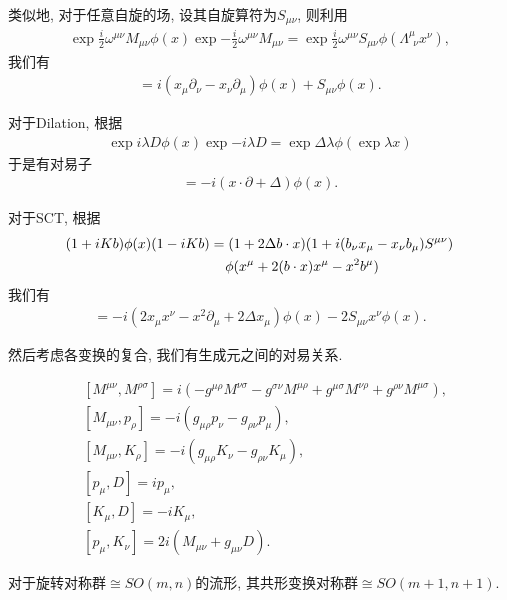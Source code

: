 类似地, 对于任意自旋的场, 设其自旋算符为$S_{\mu\nu}$, 则利用
\begin{align}
    \exp{\frac i2\omega^{\mu\nu}M_{\mu\nu}}\phi(x)\exp{-\frac i2\omega^{\mu\nu}M_{\mu\nu}}=\exp{\frac i2\omega^{\mu\nu}S_{\mu\nu}}\phi(\Lambda^\mu_{~~\nu}x^\nu), 
\end{align}
我们有
\begin{align}
    [M_{\mu\nu}, \phi(x)]=i(x_\mu\partial_\nu-x_\nu\partial_\mu)\phi(x)+S_{\mu\nu}\phi(x).
\end{align}

对于Dilation, 根据
\begin{align}
    \exp{i\lambda D}\phi(x)\exp{-i\lambda D}=\exp{\Delta\lambda}\phi(\exp{\lambda}x)
\end{align}
于是有对易子
\begin{align}
    [D, \phi(x)]=-i(x\cdot\partial+\Delta)\phi(x).
\end{align}

对于SCT, 根据
\begin{align}
    (1+iKb)\phi(x)(1-iKb)&=(1+2\Delta b\cdot x)(1+i(b_\nu x_\mu-x_\nu b_\mu)S^{\mu\nu})\notag\\
    &\;\;\;\;\phi(x^\mu+2(b\cdot x)x^\mu-x^2 b^\mu)
\end{align}
我们有
\begin{align}
    [K_\mu, \phi(x)]=-i(2x_\mu x^\nu-x^2\partial_\mu+2\Delta x_\mu)\phi(x)-2S_{\mu\nu}x^\nu\phi(x).
\end{align}

然后考虑各变换的复合, 我们有生成元之间的对易关系.
\begin{theorem}[共形代数]\label{basic-commutators}
    \begin{align}
        & [M^{\mu\nu}, M^{\rho\sigma}]=i(-g^{\mu\rho}M^{\nu\sigma}-g^{\sigma\nu}M^{\mu\rho}+g^{\mu\sigma}M^{\nu\rho}+g^{\rho\nu}M^{\mu\sigma}),\\
        & [M_{\mu\nu}, p_\rho]=-i(g_{\mu\rho}p_\nu-g_{\rho\nu}p_\mu),\\
        & [M_{\mu\nu}, K_\rho]=-i(g_{\mu\rho}K_\nu-g_{\rho\nu}K_\mu),\\
        & [p_\mu, D]=ip_\mu,\\
        & [K_\mu, D]=-iK_\mu,\\
        & [p_\mu, K_\nu]=2i(M_{\mu\nu}+g_{\mu\nu}D).
    \end{align}
\end{theorem}

\begin{theorem}
    对于旋转对称群$\cong SO(m, n)$的流形, 其共形变换对称群$\cong SO(m+1, n+1)$.
\end{theorem}


